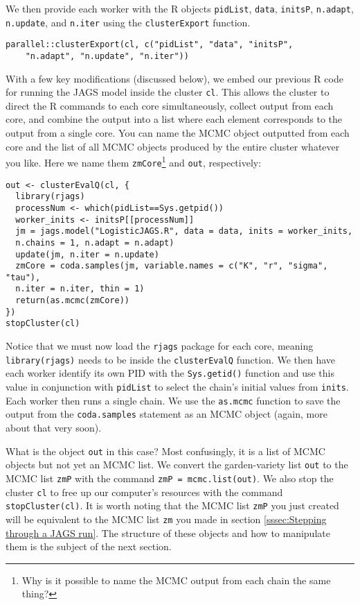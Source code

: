 \documentclass[12pt,english]{article}
\begin{document}
\noindent We then provide each worker with the R objects \texttt{pidList}, \texttt{data}, \texttt{initsP}, \texttt{n.adapt}, \texttt{n.update}, and \texttt{n.iter} using the \texttt{clusterExport} function.

\begin{Verbatim}
parallel::clusterExport(cl, c("pidList", "data", "initsP", 
	"n.adapt", "n.update", "n.iter"))
\end{Verbatim}

\noindent With a few key modifications (discussed below), we embed our previous R code for running the JAGS model inside the cluster \texttt{cl}. This allows the cluster to direct the R commands to each core simultaneously, collect output from each core, and combine the output into a list where each element corresponds to the output from a single core. You can name the MCMC object outputted from each core and the list of all MCMC objects produced by the entire cluster whatever you like. Here we name them \texttt{zmCore}\footnote{Why is it possible to name the MCMC output from each chain the same thing?} and \texttt{out}, respectively:

\begin{Verbatim}
out <- clusterEvalQ(cl, {
  library(rjags)
  processNum <- which(pidList==Sys.getpid())
  worker_inits <- initsP[[processNum]]
  jm = jags.model("LogisticJAGS.R", data = data, inits = worker_inits, 
  n.chains = 1, n.adapt = n.adapt)
  update(jm, n.iter = n.update)
  zmCore = coda.samples(jm, variable.names = c("K", "r", "sigma", "tau"), 
  n.iter = n.iter, thin = 1)
  return(as.mcmc(zmCore))
}) 
stopCluster(cl)
\end{Verbatim}

\noindent Notice that we must now load the \texttt{rjags} package for each core, meaning \texttt{library(rjags)} needs to be inside the \texttt{clusterEvalQ} function. We then have each worker identify its own PID with the \texttt{Sys.getid()} function and use this value in conjunction with \texttt{pidList} to select the chain's initial values from \texttt{inits}. Each worker then runs a single chain. We use the \texttt{as.mcmc} function to save the output from the \texttt{coda.samples} statement as an MCMC object (again, more about that very soon).

What is the object \texttt{out} in this case? Most confusingly, it is a list of MCMC objects but not yet an MCMC list. We convert the garden-variety list \texttt{out} to the MCMC list \texttt{zmP} with the command \texttt{zmP = mcmc.list(out)}. We also stop the cluster \texttt{cl} to free up our computer's resources with the command \texttt{stopCluster(cl)}. It is worth noting that the MCMC list \texttt{zmP} you just created will be equivalent to the MCMC list \texttt{zm} you made in section \ref{sssec:Stepping through a JAGS run}. The structure of these objects and how to manipulate them is the subject of the next section.
\end{document}
